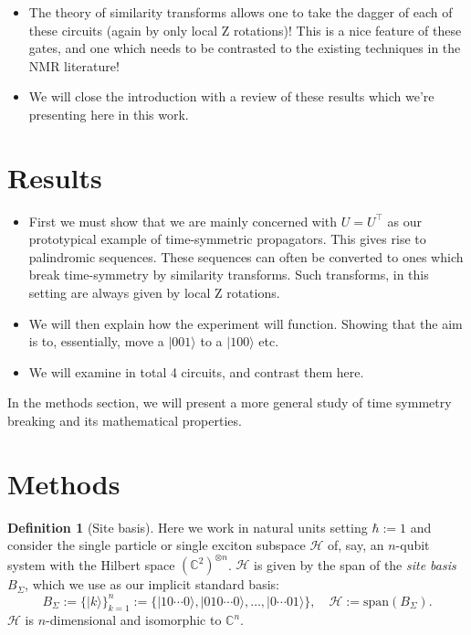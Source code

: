 \documentclass[aps,pra,12pt,nofootinbib,superscriptaddress,longbibliography,showpacs]{revtex4-1}
\theoremstyle{plain}
\theoremstyle{definition}
\newtheorem{definition}[theorem]{Definition}
\newcommand{\ket}[1]{\ensuremath{|#1\rangle}}
\newcommand{\CC}{{\mathbb C}}  %
\newcommand{\hilb}[1]{\ensuremath{\mathcal{#1}}} %
\newcommand{\be}{\begin{equation}}
\newcommand{\ee}{\end{equation}}
\begin{document}
\begin{itemize}
\item The theory of similarity transforms allows one to take the dagger of each of these circuits (again by only local Z rotations)!  This is a nice feature of these gates, and one which needs to be contrasted to the existing techniques in the NMR literature!  

\item We will close the introduction with a  review of these results which we're presenting here in this work.  

\end{itemize} 

\section{Results} 

\begin{itemize} 
\item First we must show that we are mainly concerned with $U=U^\top$ as our prototypical example of time-symmetric propagators.  This gives rise to  palindromic sequences.  These sequences can often be converted to ones which break time-symmetry by similarity transforms.  Such transforms, in this setting are always given by local Z rotations.  
\item We will then explain how the experiment will function.  Showing that the aim is to, essentially, move a $\ket{001}$ to a $\ket{100}$ etc.  
\item We will examine in total 4 circuits, and contrast them here.   
\end{itemize} 

In the methods section, we will present a more general study of time symmetry breaking and its mathematical properties.  


\section{Methods}

\begin{definition}[Site basis] 
Here we work in natural units setting $\hbar := 1$ and consider the single particle or single exciton subspace
$\hilb{H}$ of,
say, an $n$-qubit system with the Hilbert space $(\CC^2)^{\otimes n}$.
$\hilb{H}$ is given by the span of the \emph{site basis}~$B_\Sigma$, which we use
as our implicit standard basis:
\be
B_\Sigma := \{\ket{k}\}_{k=1}^n := \{\ket{10\cdots0}, \ket{010\cdots0}, \ldots, \ket{0\cdots01}\},
\quad \hilb{H} := \text{span}(B_\Sigma).
\ee
$\hilb{H}$ is $n$-dimensional and isomorphic to $\CC^{n}$.
\end{definition} 
\end{document}
